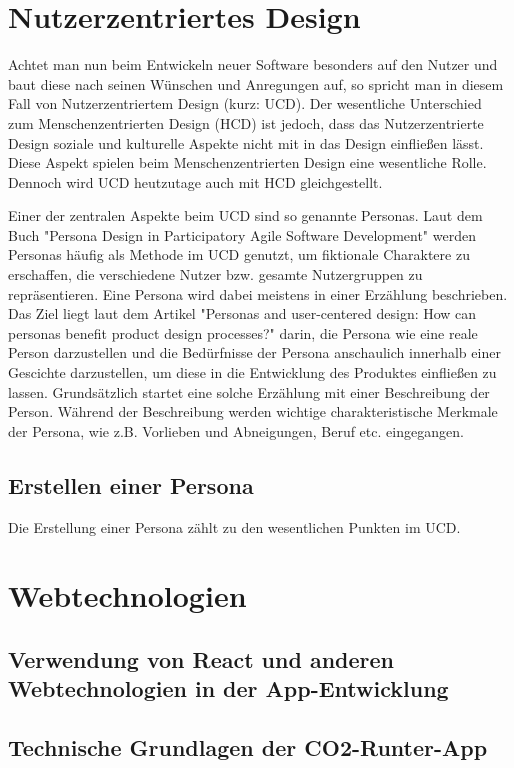\section{Nutzerzentriertes Design}
Achtet man nun beim Entwickeln neuer Software besonders auf den Nutzer und baut diese nach seinen Wünschen und Anregungen auf, so spricht man in diesem Fall von Nutzerzentriertem Design (kurz: UCD). Der wesentliche Unterschied zum Menschenzentrierten Design (HCD) ist jedoch, dass das Nutzerzentrierte Design soziale und kulturelle Aspekte nicht mit in das Design einfließen lässt.\cite{hcd2:2021} Diese Aspekt spielen beim Menschenzentrierten Design eine wesentliche Rolle. Dennoch wird UCD heutzutage auch mit HCD gleichgestellt.\cite{ucd1:2011}

Einer der zentralen Aspekte beim UCD sind so genannte Personas. Laut dem Buch "Persona Design in Participatory Agile Software Development" werden Personas häufig als Methode im UCD genutzt, um fiktionale Charaktere zu erschaffen, die verschiedene Nutzer bzw. gesamte Nutzergruppen zu repräsentieren.\cite{personaDesign:2020} Eine Persona wird dabei meistens in einer Erzählung beschrieben.\cite{ucd1:2011} Das Ziel liegt laut dem Artikel "Personas and user-centered design: How can personas benefit product design processes?" darin, die Persona wie eine reale Person darzustellen und die Bedürfnisse der Persona anschaulich innerhalb einer Gescichte darzustellen, um diese in die Entwicklung des Produktes einfließen zu lassen.\cite{ucd1:2011}
Grundsätzlich startet eine solche Erzählung mit einer Beschreibung der Person.\cite{ucd1:2011} Während der Beschreibung werden wichtige charakteristische Merkmale der Persona, wie z.B. Vorlieben und Abneigungen, Beruf etc. eingegangen.\cite{ucd1:2011}

\subsection{Erstellen einer Persona}
Die Erstellung einer Persona zählt zu den wesentlichen Punkten im UCD.

\section{Webtechnologien}

\subsection{Verwendung von React und anderen Webtechnologien in der App-Entwicklung}

\subsection{Technische Grundlagen der CO2-Runter-App}
